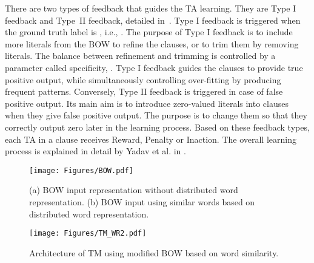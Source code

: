 \documentclass[11pt]{article}
\begin{document}
 There are two types of feedback that guides the TA learning. They are Type I feedback and Type~II feedback, detailed in~\cite{Granmo2018TheTM}. Type I feedback is triggered when the ground truth label is , i.e., . The purpose of Type I feedback is to include more literals from the BOW to refine the clauses, or to trim them by removing literals. The balance between refinement and trimming is controlled by a parameter called specificity, . Type I feedback guides the clauses to provide true positive output, while simultaneously controlling over-fitting by producing frequent patterns. Conversely, Type II feedback is triggered in case of false positive output. Its main aim is to introduce zero-valued literals into clauses when they give false positive output. The purpose is to change them so that they correctly output zero later in the learning process. Based on these feedback types, each TA in a clause receives Reward, Penalty or Inaction. The overall learning process is explained in detail by Yadav et al. in \cite{yadav2021sentiment}.

\begin{figure}[h]
    \centering
    \texttt{[image: Figures/BOW.pdf]}
    \caption{(a) BOW input representation without distributed word representation. (b) BOW input using similar words based on distributed word representation.}
    \label{fig5}
\end{figure}


\begin{figure*}[h]
    \centering
    \texttt{[image: Figures/TM\_WR2.pdf]}
    \caption{Architecture of TM using modified BOW based on word similarity.}
    \label{fig66}
\end{figure*}
\end{document}
